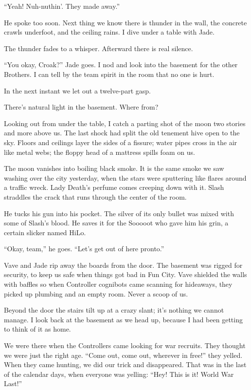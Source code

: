 “Yeah! Nuh-nuthin'. They made away.”

He spoke too soon. Next thing we know there is thunder in the wall, the concrete crawls underfoot, and the ceiling rains. I dive under a table with Jade.

The thunder fades to a whisper. Afterward there is real silence.

“You okay, Croak?” Jade goes. I nod and look into the basement for the other Brothers. I can tell by the team spirit in the room that no one is hurt.

In the next instant we let out a twelve-part gasp.

There's natural light in the basement. Where from?

Looking out from under the table, I catch a parting shot of the moon two stories and more above us. The last shock had split the old tenement hive open to the sky. Floors and ceilings layer the sides of a fissure; water pipes cross in the air like metal webs; the floppy head of a mattress spills foam on us.

The moon vanishes into boiling black smoke. It is the same smoke we saw washing over the city yesterday, when the stars were sputtering like flares around a traffic wreck. Lady Death's perfume comes creeping down with it.
Slash straddles the crack that runs through the center of the room.

He tucks his gun into his pocket. The silver of its only bullet was mixed with some of Slash's blood. He saves it for the Sooooot who gave him his grin, a certain slicker named HiLo.

“Okay, team,” he goes. “Let's get out of here pronto.”

Vave and Jade rip away the boards from the door. The basement was rigged for security, to keep us safe when things got bad in Fun City. Vave shielded the walls with baffles so when Controller cognibots came scanning for hideaways, they picked up plumbing and an empty room. Never a scoop of us.

Beyond the door the stairs tilt up at a crazy slant; it's nothing we cannot manage. I look back at the basement as we head up, because I had been getting to think of it as home.

We were there when the Controllers came looking for war recruits. They thought we were just the right age.
“Come out, come out, wherever in free!” they yelled. When they came hunting, we did our trick and disappeared.
That was in the last of the calendar days, when everyone was yelling: “Hey! This is it! World War Last!”

